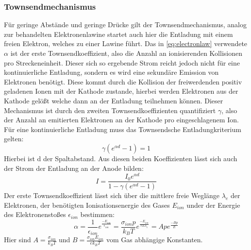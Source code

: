 \subsubsection{Townsendmechanismus}

Für geringe Abstände und geringe Drücke gilt der Townsendmechanismus, analog zur behandelten Elektronenlawine startet auch hier die Entladung mit einem freien Elektron, welches zu einer Lawine führt. Das in \eqref{eq:electronlaw} verwendete \(\alpha\) ist der erste Townsendkoeffizient, also die Anzahl an ionisierenden Kollisionen pro Streckeneinheit. Dieser sich so ergebende Strom reicht jedoch nicht für eine kontinuierliche Entladung, sondern es wird eine sekundäre Emission von Elektronen benötigt. Diese kommt durch die Kollision der freiwerdenden positiv geladenen Ionen mit der Kathode zustande, hierbei werden Elektronen aus der Kathode gelößt welche dann an der Entladung teilnehmen können. Dieser Mechanismus ist durch den zweiten Townsendkoeffizienten quantifiziert \(\gamma\), also der Anzahl an emitierten Elektronen an der Kathode pro eingeschlagenem Ion. Für eine kontinuierliche Entladung muss das Townsendsche Entladungkriterium gelten:
\begin{equation}
    \gamma (e^{\alpha d}-1) = 1
    \label{eq:townsendkrit}
\end{equation}
Hierbei ist d der Spaltabstand. Aus diesen beiden Koeffizienten lässt sich auch der Strom der Entladung an der Anode bilden:
\begin{equation}
    I = \frac{I_0 e^{\alpha d}}{1-\gamma (e^{\alpha d} -1)}
\end{equation}
Der erste Townsendkoeffizient lässt sich über die mittlere freie Weglänge \(\lambda_e\) der Elektronen, der benötigten Ionisationsenergie des Gases \(E_{ion}\) under der Energie des Elektronenstoßes \(\epsilon_{ion}\) bestimmen:
\begin{equation}
    \alpha = \frac{1}{\epsilon_{ion}} e^{\frac{-E_{ion}}{\epsilon_{ion}}} 
    = \frac{\sigma_{ion}p}{k_B T} e^{\frac{-E_{ion}}{eE\lambda_e}} 
    = A p e^{\frac{-Bp}{E}}
    \label{eq:firsttownsend}
\end{equation}
Hier sind \(A = \frac{\sigma_{ion}}{k_B T}\) und \(B = \frac{\sigma_{ion} E_{ion}}{ek_B T}\) vom Gas abhängige Konstanten. \cite{fu2020}


